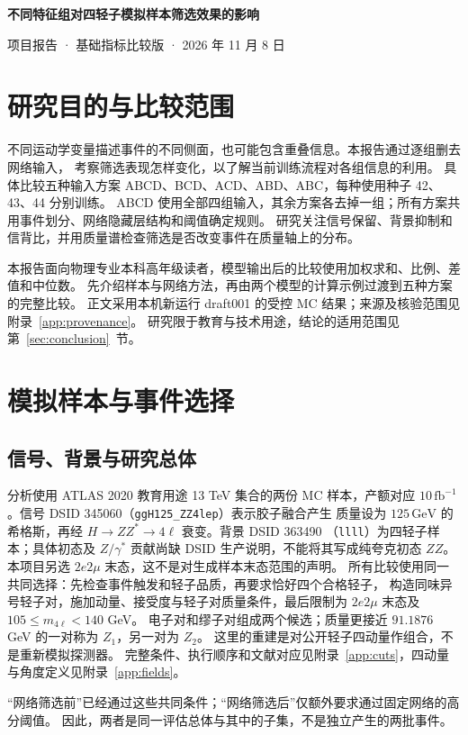 \documentclass[11pt,a4paper,fontset=fandol,scheme=plain]{ctexart}
\newcommand{\gev}{\,\mathrm{GeV}}
\begin{document}
{\LARGE\bfseries\color{reportblue} 不同特征组对四轻子模拟样本筛选效果的影响\par}
\vspace{6pt}
项目报告 · 基础指标比较版 · 2026 年 11 月 8 日

\section{研究目的与比较范围}

不同运动学变量描述事件的不同侧面，也可能包含重叠信息。本报告通过逐组删去网络输入，
考察筛选表现怎样变化，以了解当前训练流程对各组信息的利用。
具体比较五种输入方案 ABCD、BCD、ACD、ABD、ABC，每种使用种子 42、43、44 分别训练。
ABCD 使用全部四组输入，其余方案各去掉一组；所有方案共用事件划分、网络隐藏层结构和阈值确定规则。
研究关注信号保留、背景抑制和信背比，并用质量谱检查筛选是否改变事件在质量轴上的分布。

本报告面向物理专业本科高年级读者，模型输出后的比较使用加权求和、比例、差值和中位数。
先介绍样本与网络方法，再由两个模型的计算示例过渡到五种方案的完整比较。
正文采用本机新运行 draft001 的受控 MC 结果；来源及核验范围见附录~\ref{app:provenance}。
研究限于教育与技术用途，结论的适用范围见第~\ref{sec:conclusion}~节。

\section{模拟样本与事件选择}

\subsection{信号、背景与研究总体}
分析使用 ATLAS 2020 教育用途 13 TeV 集合的两份 MC 样本\cite{OpenData}，产额对应
$10\,\mathrm{fb}^{-1}$。信号 DSID 345060（\texttt{ggH125\_ZZ4lep}）表示胶子融合产生
质量设为 $125\gev$ 的希格斯，再经 $H\to ZZ^*\to4\ell$ 衰变。背景 DSID 363490
（\texttt{llll}）为四轻子样本；具体初态及 $Z/\gamma^*$ 贡献尚缺 DSID 生产说明，不能将其写成纯夸克初态 $ZZ$。
本项目另选 $2e2\mu$ 末态，这不是对生成样本末态范围的声明。
所有比较使用同一共同选择：先检查事件触发和轻子品质，再要求恰好四个合格轻子，
构造同味异号轻子对，施加动量、接受度与轻子对质量条件，最后限制为
$2e2\mu$ 末态及 $105\leq m_{4\ell}<140$ GeV。
电子对和缪子对组成两个候选；质量更接近 $91.1876$ GeV 的一对称为 $Z_1$，另一对为 $Z_2$。
这里的重建是对公开轻子四动量作组合，不是重新模拟探测器。
完整条件、执行顺序和文献对应见附录~\ref{app:cuts}，四动量与角度定义见附录~\ref{app:fields}。

“网络筛选前”已经通过这些共同条件；“网络筛选后”仅额外要求通过固定网络的高分阈值。
因此，两者是同一评估总体与其中的子集，不是独立产生的两批事件。
\end{document}
